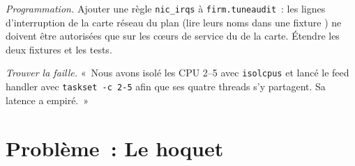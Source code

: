 \begin{exercise}[$\star\star\star$]\label{exo:ll:linux-tuning:7}
\emph{Programmation.} Ajouter une règle \texttt{nic\_irqs} à \texttt{firm.tuneaudit}~: les lignes d'interruption de la carte réseau du plan (lire
leurs noms dans une fixture ) ne doivent être autorisées que sur les cœurs de service du  de la carte. Étendre les deux
fixtures et les tests.
\end{exercise}

\begin{exercise}[$\star\star\star$]\label{exo:ll:linux-tuning:8}
\emph{Trouver la faille.} «~Nous avons isolé les CPU 2--5 avec \texttt{isolcpus} et lancé le feed handler avec \texttt{taskset -c 2-5}
afin que ses quatre threads s'y partagent. Sa latence a empiré.~»
\end{exercise}

\section{Problème~: Le hoquet}

